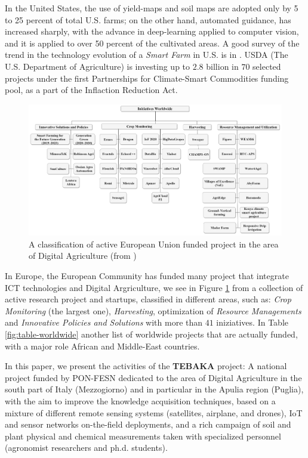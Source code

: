 \documentclass[a4paper, comsoc]{IEEEtran}
\begin{document}
In the United States, the use of yield-maps and soil maps are adopted only by 5 to 25 percent of total U.S. farms; on the other hand, automated guidance, has increased sharply, with the advance in deep-learning applied to computer vision, and it is applied to over 50 percent of the cultivated areas. A good survey of the trend in the technology evolution of a \emph{Smart Farm} in U.S. is in \cite{mcfadden2023precision}. USDA (The U.S. Department of Agriculture) is investing up to $2.8$ billion in $70$ selected projects under the first Partnerships for Climate-Smart Commodities funding pool, as a part of the Inflaction Reduction Act.


\begin{figure}
    \centering
    \includegraphics[width=\columnwidth]{agriengineering-04-00029-g005}
    \caption{A classification of active European Union funded project in the area of Digital Agriculture (from \cite{agriengineering4020029})}
    \label{fig:euprojects}
\end{figure}

In Europe, the European Community has funded many project that integrate ICT technologies and Digital Argriculture, we see in Figure \ref{fig:euprojects} from \cite{agriengineering4020029} a collection of active research project and startups, classified in different areas, such as:  \emph{Crop Monitoring}  (the largest one), \emph{Harvesting}, optimization of \emph{Resource Managements} and \emph{Innovative Policies and Solutions} with more than $41$ iniziatives. In Table \ref{fig:table-worldwide} another list of worldwide projects that are actually funded, with a major role African and Middle-East countries.

In this paper, we present the activities of the \textbf{TEBAKA} project: A national project funded by PON-FESN  dedicated to the area of Digital Agriculture in the south part of Italy (Mezzogiorno) and in particular in the Apulia region (Puglia), with the aim to improve the knowledge acquisition techniques, based on a mixture of different remote sensing systems (satellites, airplane, and drones), IoT and sensor networks on-the-field deployments, and a rich campaign of soil and plant physical and chemical  measurements taken with specialized personnel (agronomist researchers and ph.d. students). 
\end{document}
